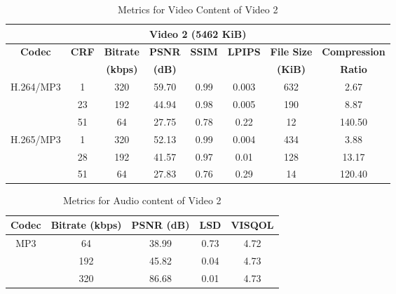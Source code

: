 \documentclass{ioereport}
\begin{document}
    

    \begin{table}[H]
        \centering
        \caption{Metrics for Video Content of Video 2}
        \label{table:vid-met-2}
        \begin{tabular}{|c|c|c|c|c|c|c|c|}
        \hline
        \multicolumn{8}{|c|}{\textbf{Video 2 (5462 KiB)}} \\ \hline
        \multirow{2}{*}{\textbf{Codec}} & \multirow{2}{*}{\textbf{CRF}} & \textbf{Bitrate} & \textbf{PSNR} & \textbf{SSIM} & \textbf{LPIPS} & \textbf{File Size} & \textbf{Compression} \\ 
        &  & \textbf{(kbps)} & \textbf{(dB)} &  &  & \textbf{(KiB)} & \textbf{Ratio} \\ \hline
        \multirow{3}{*}{H.264/MP3} & 1  & 320 & 59.70 & 0.99 & 0.003 & 632 & 2.67 \\ \cline{2-8} 
                                & 23 & 192 & 44.94 & 0.98 & 0.005 & 190 & 8.87 \\ \cline{2-8} 
                                & 51 & 64  & 27.75 & 0.78 & 0.22 & 12  & 140.50 \\ \hline
        \multirow{3}{*}{H.265/MP3} & 1  & 320 & 52.13 & 0.99 & 0.004 & 434 & 3.88 \\ \cline{2-8} 
                                & 28 & 192 & 41.57 & 0.97 & 0.01 & 128 & 13.17 \\ \cline{2-8} 
                                & 51 & 64  & 27.83 & 0.76 & 0.29 & 14  & 120.40 \\ \hline
        \end{tabular}
    \end{table}
    

    \begin{table}[H]
        \centering
        \caption{Metrics for Audio content of Video 2}
        \label{table:aud-met-2}
        \begin{tabular}{|c|c|c|c|c|}
        \hline
        \textbf{Codec} & \textbf{Bitrate (kbps)} & \textbf{PSNR (dB)} & \textbf{LSD} & \textbf{VISQOL} \\ \hline
        \multirow{3}{*}{MP3} & 64  & 38.99 & 0.73 & 4.72 \\ \cline{2-5} 
                                   & 192 & 45.82 & 0.04 & 4.73 \\ \cline{2-5} 
                                   & 320 & 86.68 & 0.01 & 4.73 \\ \hline
        \end{tabular}
    \end{table}
    
\end{document}
